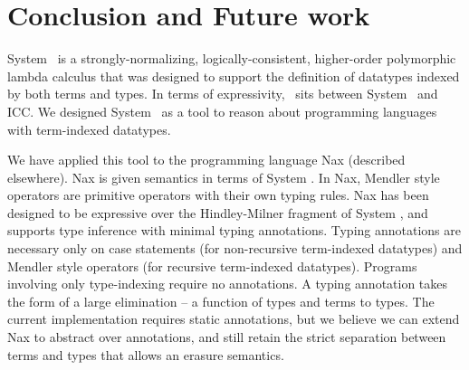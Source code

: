 \section{Conclusion and Future work}
\label{sec:concl}

System \Fi\ is a strongly-normalizing, logically-consistent, higher-order
polymorphic lambda calculus that was designed to support the
definition of datatypes indexed by both terms and types.
In terms of expressivity, \Fi\ sits between System \Fw\ and ICC.
We designed System \Fi\ as a tool to reason about programming
languages with term-indexed datatypes. 

We have applied this tool to the programming language Nax (described elsewhere).
Nax is given semantics in terms of System \Fi . In Nax, Mendler style operators
are primitive operators with their own typing rules. Nax has been designed to
be expressive over the Hindley-Milner fragment of System \Fi, and supports type
inference with minimal typing annotations. Typing annotations are necessary only
on case statements (for non-recursive term-indexed datatypes)
and Mendler style operators (for recursive term-indexed datatypes).
Programs involving only type-indexing require no annotations.
A typing annotation takes the form of a large elimination --
a function of types and terms to types. The current implementation requires
static annotations, but we believe we can extend Nax to abstract over
annotations, and still retain the strict separation between terms and types
that allows an erasure semantics.
 
